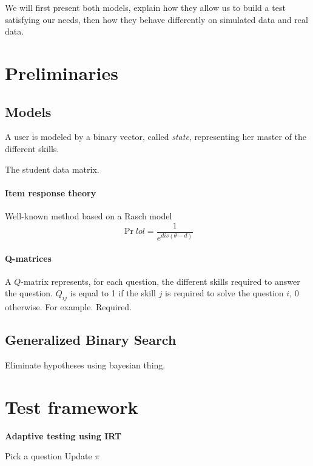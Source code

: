 \documentclass{sig-alternate}
\begin{document}
We will first present both models, explain how they allow us to build a test satisfying our needs, then how they behave differently on simulated data and real data.

\section{Preliminaries}

\subsection{Models}

A user is modeled by a binary vector, called \emph{state}, representing her master of the different skills.

The student data matrix.

\paragraph{Item response theory} Well-known method based on a Rasch model
\[ \Pr{lol} = \frac1{e^{dis(\theta - d)}} \]

\paragraph{Q-matrices} A $Q$-matrix represents, for each question, the different skills required to answer the question. $Q_{ij}$ is equal to 1 if the skill $j$ is required to solve the question $i$, 0 otherwise. For example. Required.

\subsection{Generalized Binary Search}

Eliminate hypotheses using bayesian thing.

\section{Test framework}

\begin{algorithm}
\caption*{\textbf{Adaptive testing using IRT}}
\begin{algorithmic}
	\State Pick a question
	\State Update $\pi$
\EndWhile
\EndProcedure
\end{algorithmic}
\end{algorithm}
\end{document}

